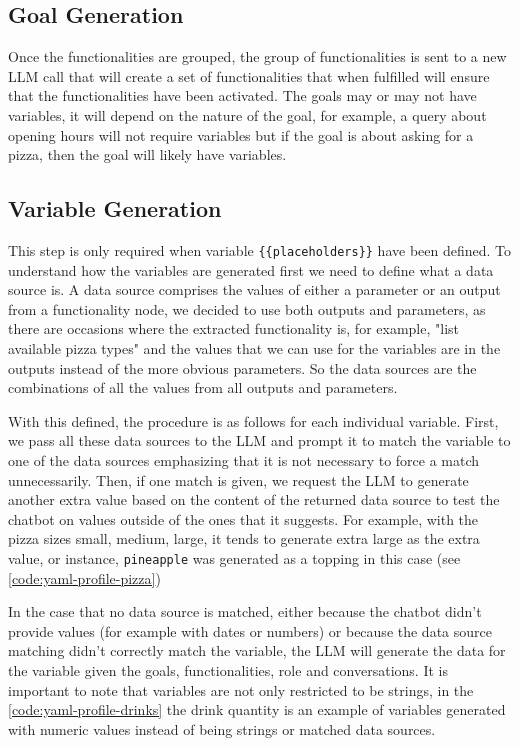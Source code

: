 \subsection{Goal Generation}

Once the functionalities are grouped,
the group of functionalities is sent to a new \ac{LLM} call
that will create a set of functionalities that when fulfilled
will ensure that the functionalities have been activated.
The goals may or may not have variables,
it will depend on the nature of the goal,
for example, a query about opening hours will not require variables
but if the goal is about asking for a pizza,
then the goal will likely have variables.

\subsection{Variable Generation}

This step is only required when variable \texttt{\{\{placeholders\}\}} have been defined.
To understand how the variables are generated
first we need to define what a data source is.
A data source comprises the values of either a parameter or an output from a functionality node,
we decided to use both outputs and parameters,
as there are occasions where the extracted functionality is,
for example, "list available pizza types"
and the values that we can use for the variables
are in the outputs instead of the more obvious parameters.
So the data sources are the combinations of all the values
from all outputs and parameters.

With this defined, the procedure is as follows for each individual variable.
First, we pass all these data sources to the \ac{LLM}
and prompt it to match the variable to one of the data sources
emphasizing that it is not necessary to force a match unnecessarily.
Then, if one match is given,
we request the \ac{LLM} to generate another extra value
based on the content of the returned data source
to test the chatbot on values outside of the ones that it suggests.
For example, with the pizza sizes small, medium, large,
it tends to generate extra large as the extra value,
or instance, \texttt{pineapple} was generated as a topping in this case
(see \autoref{code:yaml-profile-pizza})

In the case that no data source is matched,
either because the chatbot didn't provide values
(for example with dates or numbers)
or because the data source matching didn't correctly match the variable,
the \ac{LLM} will generate the data for the variable given
the goals, functionalities, role and conversations.
It is important to note that variables are not only restricted to be strings,
in the \autoref{code:yaml-profile-drinks} the drink quantity
is an example of variables generated
with numeric values instead of being strings or matched data sources.

